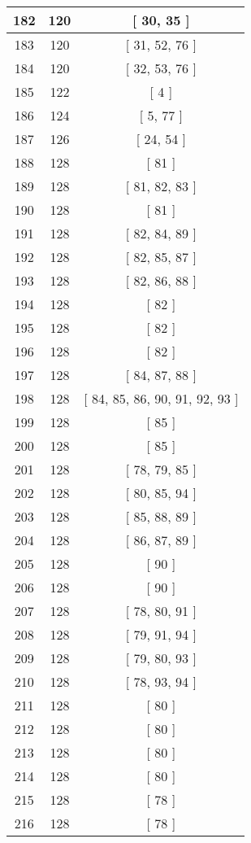 \begin{center}
\begin{longtable}[H]{|| c c c ||}
\hline
182 & 120 & [ 30, 35 ] \\ 
\hline
183 & 120 & [ 31, 52, 76 ] \\ 
\hline
184 & 120 & [ 32, 53, 76 ] \\ 
\hline
185 & 122 & [ 4 ] \\ 
\hline
186 & 124 & [ 5, 77 ] \\ 
\hline
187 & 126 & [ 24, 54 ] \\ 
\hline
188 & 128 & [ 81 ] \\ 
\hline
189 & 128 & [ 81, 82, 83 ] \\ 
\hline
190 & 128 & [ 81 ] \\ 
\hline
191 & 128 & [ 82, 84, 89 ] \\ 
\hline
192 & 128 & [ 82, 85, 87 ] \\ 
\hline
193 & 128 & [ 82, 86, 88 ] \\ 
\hline
194 & 128 & [ 82 ] \\ 
\hline
195 & 128 & [ 82 ] \\ 
\hline
196 & 128 & [ 82 ] \\ 
\hline
197 & 128 & [ 84, 87, 88 ] \\ 
\hline
198 & 128 & [ 84, 85, 86, 90, 91, 92, 93 ] \\ 
\hline
199 & 128 & [ 85 ] \\ 
\hline
200 & 128 & [ 85 ] \\ 
\hline
201 & 128 & [ 78, 79, 85 ] \\ 
\hline
202 & 128 & [ 80, 85, 94 ] \\ 
\hline
203 & 128 & [ 85, 88, 89 ] \\ 
\hline
204 & 128 & [ 86, 87, 89 ] \\ 
\hline
205 & 128 & [ 90 ] \\ 
\hline
206 & 128 & [ 90 ] \\ 
\hline
207 & 128 & [ 78, 80, 91 ] \\ 
\hline
208 & 128 & [ 79, 91, 94 ] \\ 
\hline
209 & 128 & [ 79, 80, 93 ] \\ 
\hline
210 & 128 & [ 78, 93, 94 ] \\ 
\hline
211 & 128 & [ 80 ] \\ 
\hline
212 & 128 & [ 80 ] \\ 
\hline
213 & 128 & [ 80 ] \\ 
\hline
214 & 128 & [ 80 ] \\ 
\hline
215 & 128 & [ 78 ] \\ 
\hline
216 & 128 & [ 78 ] \\ 

\end{longtable}
\end{center}
